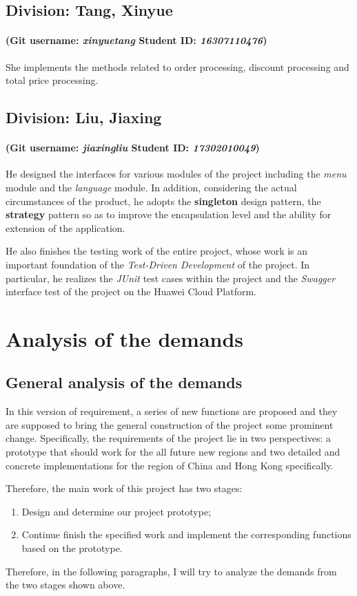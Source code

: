\documentclass[a4paper]{report}
\begin{document}
\section{Division: Tang, Xinyue}
\subsubsection{(Git username: \emph{xinyuetang} Student ID: \emph{16307110476})}
She implements the methods related to order processing, discount processing and total price processing.

\section{Division: Liu, Jiaxing}
\subsubsection{(Git username: \emph{jiaxingliu} Student ID: \emph{17302010049})}
He designed the interfaces for various modules of the project including the \emph{menu} module and the \emph{language} module. In addition, considering the actual circumstances of the product, he adopts the \textbf{singleton} design pattern, the \textbf{strategy} pattern so as to improve the encapsulation level and the ability for extension of the application. 
\par
He also finishes the testing work of the entire project, whose work  is an important foundation of the \emph{Test-Driven Development} of the project. In particular, he realizes the \emph{JUnit} test cases within the project and the \emph{Swagger} interface test of the project on the Huawei Cloud Platform.



\chapter{Analysis of the demands}
\section{General analysis of the demands}
In this version of requirement, a series of new functions are proposed and they are supposed to bring the general construction of the project some prominent change. Specifically, the requirements of the project lie in two perspectives: a prototype that should work for the all future new regions and two detailed and concrete implementations for the region of China and Hong Kong specifically.
\par
Therefore, the main work of this project has two stages:
\begin{enumerate}
\item
Design and determine our project prototype;
\item
Continue finish the specified work and implement the corresponding functions based on the prototype.
\end{enumerate}
\par
Therefore, in the following paragraphs, I will try to analyze the demands from the two stages shown above.
\end{document}
